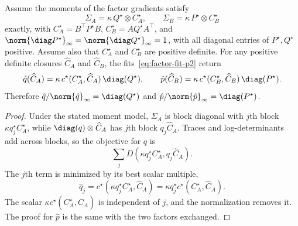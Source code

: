 \begin{lemma}\label{lem:consistency-p2}
Assume the moments of the factor gradients satisfy
\[
  \Sigma_A=\kappa\,Q^\star\otimes C^\star_A,
  \qquad
  \Sigma_B=\kappa\,P^\star\otimes C^\star_B
\]
exactly, with
$C^\star_A=B^\top P^\star B$,
$C^\star_B=AQ^\star A^\top$, and
$\norm{\diag P^\star}_\infty=\norm{\diag Q^\star}_\infty=1$, with all
diagonal entries of $P^\star,Q^\star$ positive. Assume also that
$C^\star_A$ and $C^\star_B$ are positive definite.
For any positive definite closures $\widehat C_A$ and $\widehat C_B$, the
fits~\eqref{eq:factor-fit-p2} return
\[
  \hat{q}(\widehat C_A)
  =
  \kappa\,c^\star(C^\star_A,\widehat C_A)\,\diag(Q^\star),
  \qquad
  \hat{p}(\widehat C_B)
  =
  \kappa\,c^\star(C^\star_B,\widehat C_B)\,\diag(P^\star).
\]
Therefore
$\hat{q}/\norm{\hat{q}}_\infty=\diag(Q^\star)$ and
$\hat{p}/\norm{\hat{p}}_\infty=\diag(P^\star)$.
\end{lemma}
\begin{proof}
Under the stated moment model, $\Sigma_A$ is block diagonal
with $j$th block $\kappa q^\star_j C^\star_A$, while
$\diag(q)\otimes\widehat C_A$ has $j$th block $q_j\widehat C_A$.
Traces and log-determinants add across blocks, so the objective for
$q$ is
\[
  \sum_j D(\kappa q^\star_j C^\star_A, q_j\widehat C_A).
\]
The $j$th term is minimized by its best scalar multiple,
\[
  \hat q_j
  =
  c^\star(\kappa q^\star_j C^\star_A,\widehat C_A)
  =
  \kappa q^\star_j c^\star(C^\star_A,\widehat C_A).
\]
The scalar $\kappa c^\star(C^\star_A,\widehat C_A)$ is independent of
$j$, and the normalization removes it. The proof for $\hat p$ is the
same with the two factors exchanged.
\end{proof}

